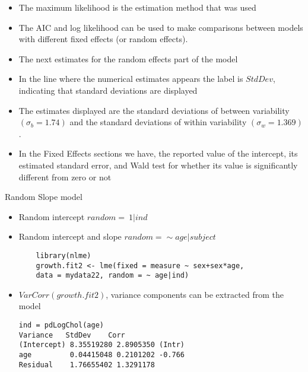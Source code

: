 \documentclass{beamer}
\begin{document}
\begin{frame}
\begin{itemize}
\item The maximum likelihood is the estimation method that was used
\item The AIC and log likelihood can be used to make comparisons between models with different fixed effects (or random effects).
\item The next estimates for the random effects part of the model
\item In the line where the numerical estimates appears the label is $StdDev$, indicating that standard deviations are displayed
\item The estimates displayed are the standard deviations of between variability $(\sigma_b= 1.74)$ and the standard deviations of within variability $(\sigma_w= 1.369 )$.
\item In the Fixed Effects sections we have, the reported value of the intercept, its estimated standard error, and Wald test for whether its value is significantly different from zero or not
\end{itemize}
\end{frame}

\begin{frame}[fragile]{Random Slope model}
\begin{itemize}
	\item Random intercept $random = ~1|ind$
	\item Random intercept and slope $random = \sim age|subject$
	\begin{verbatim}
	library(nlme)
	growth.fit2 <- lme(fixed = measure ~ sex+sex*age, 
	data = mydata22, random = ~ age|ind)
	\end{verbatim}
\item $VarCorr(growth.fit2)$, variance components can be extracted from the model 
\begin{verbatim}
ind = pdLogChol(age) 
Variance   StdDev    Corr  
(Intercept) 8.35519280 2.8905350 (Intr)
age         0.04415048 0.2101202 -0.766
Residual    1.76655402 1.3291178
\end{verbatim}
\end{itemize}
\end{frame}
\end{document}
